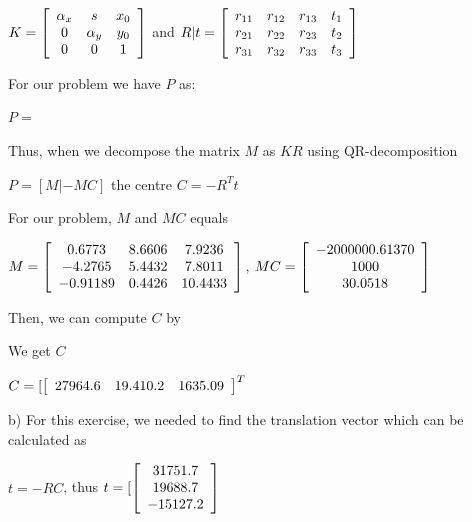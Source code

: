 \documentclass[]{article}
\begin{document}
\centerline {
		$K = \left[ {\begin{array}{*{20}c}
		\alpha _x & s & x_0\\
		0 & \alpha _y & y_0 \\ 
		0 & 0 & 1   
		\end{array} } \right]$ and $R|t = \left[ {\begin{array}{*{20}c}
		r_{11} & r_{12} & r_{13} & t_1 \\
		r_{21} & r_{22} & r_{23} & t_2 \\ 
		r_{31} & r_{32} & r_{33} & t_3    
		\end{array} } \right]$
}

For our problem we have $P$ as:

\centerline {
	$P = $
}

Thus, when we decompose the matrix $M$ as $KR$ using QR-decomposition 

\centerline {
	$P = [M| -MC]$ the centre $C = -R^Tt$
}

For our problem, $M$ and $MC$ equals 

\centerline {
	$M = \left[ {\begin{array}{*{20}c}
		0.6773 & 8.6606 & 7.9236 \\
		-4.2765 & 5.4432 & 7.8011 \\ 
		-0.91189 & 0.4426 & 10.4433     
		\end{array} } \right]$, $MC = \left[ {\begin{array}{*{20}c}
		-2000000.61370 \\
		1000 \\ 
		30.0518     
		\end{array} } \right] $
}

Then, we can compute $C$ by



We get  $C$ 

\centerline {
	$C = [\left[ {\begin{array}{*{20}c}
		27964.6 &  19.410.2 & 1635.09   
		\end{array} } \right]^T$
}

b) For this exercise, we needed to find the translation vector which can be calculated as 

\centerline {
	$t = -RC$, thus $t =[\left[ {\begin{array}{*{20}c}
		31751.7 \\
		19688.7 \\ 
		-15127.2   
		\end{array} } \right] $
}
\end{document}
